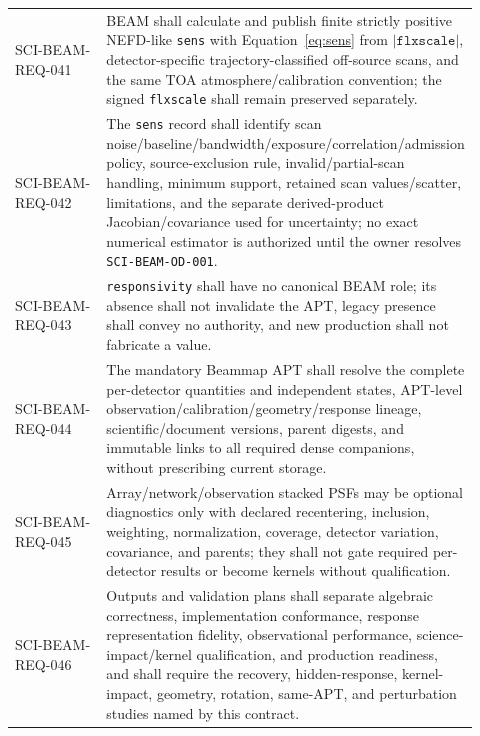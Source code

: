 \begin{longtable}{>{\raggedright\arraybackslash\ttfamily\scriptsize}p{0.20\linewidth}L{0.72\linewidth}}
SCI-BEAM-REQ-041 & BEAM shall calculate and publish finite strictly positive NEFD-like \texttt{sens} with Equation~\ref{eq:sens} from $|\texttt{flxscale}|$, detector-specific trajectory-classified off-source scans, and the same TOA atmosphere/calibration convention; the signed \texttt{flxscale} shall remain preserved separately. \\
SCI-BEAM-REQ-042 & The \texttt{sens} record shall identify scan noise/baseline/bandwidth/exposure/correlation/admission policy, source-exclusion rule, invalid/partial-scan handling, minimum support, retained scan values/scatter, limitations, and the separate derived-product Jacobian/covariance used for uncertainty; no exact numerical estimator is authorized until the owner resolves \texttt{SCI-BEAM-OD-001}. \\
SCI-BEAM-REQ-043 & \texttt{responsivity} shall have no canonical BEAM role; its absence shall not invalidate the APT, legacy presence shall convey no authority, and new production shall not fabricate a value. \\
SCI-BEAM-REQ-044 & The mandatory Beammap APT shall resolve the complete per-detector quantities and independent states, APT-level observation/calibration/geometry/response lineage, scientific/document versions, parent digests, and immutable links to all required dense companions, without prescribing current storage. \\
SCI-BEAM-REQ-045 & Array/network/observation stacked PSFs may be optional diagnostics only with declared recentering, inclusion, weighting, normalization, coverage, detector variation, covariance, and parents; they shall not gate required per-detector results or become kernels without qualification. \\
SCI-BEAM-REQ-046 & Outputs and validation plans shall separate algebraic correctness, implementation conformance, response representation fidelity, observational performance, science-impact/kernel qualification, and production readiness, and shall require the recovery, hidden-response, kernel-impact, geometry, rotation, same-APT, and perturbation studies named by this contract. \\
\bottomrule
\end{longtable}
\normalsize

